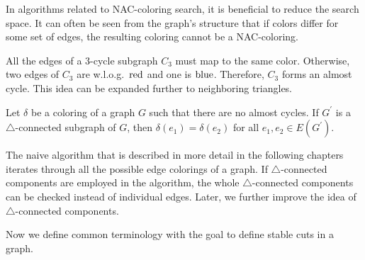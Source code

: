 In algorithms related to NAC-coloring search, it is beneficial
to reduce the search space.
It can often be seen from the graph's structure
that if colors differ for some set of edges,
the resulting coloring cannot be a NAC-coloring.

All the edges of a 3-cycle subgraph \( C_3 \) must map to the same color.
Otherwise, two edges of \( C_3 \) are w.l.o.g.\ \( \text{red} \) and one is \( \text{blue} \).
Therefore, \( C_3 \) forms an almost cycle.
This idea can be expanded further to neighboring triangles.
%
%
\begin{lemma}
	Let \( \delta \) be a coloring of a graph \( G \) such that there are
	no almost cycles. If \( G^\prime \) is
	a \( \triangle \)-connected subgraph of \( G \),
	then \( \delta(e_1) = \delta(e_2) \) for all \( e_1, e_2 \in E(G^\prime) \).
\end{lemma}
%
The naive algorithm that is described in more detail in the following chapters
iterates through all the possible edge colorings of a graph.
If \( \triangle \)-connected components are employed in the algorithm,
the whole \( \triangle \)-connected components can be checked instead of individual edges.
Later, we further improve the idea of \( \triangle \)-connected components.

Now we define common terminology with the goal to define stable cuts in a graph.

